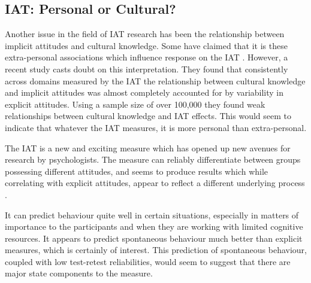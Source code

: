 


\subsection{IAT: Personal or Cultural?}
\label{sec:iat:-personal-or}


Another issue in the field of IAT research has been the relationship between implicit attitudes and cultural knowledge. Some have claimed that it is these extra-personal associations which influence response on the IAT \cite{Olson2004}. However, a recent study \cite{Nosek2007a} casts doubt on this interpretation. They found that consistently across domains measured by the IAT the relationship between cultural knowledge and implicit attitudes was almost completely accounted for by variability in explicit attitudes. Using a sample size of over 100,000 they found weak relationships between cultural knowledge and IAT effects. This would seem to indicate that whatever the IAT measures, it is more personal than extra-personal. 

The IAT is a new and exciting measure which has opened up new avenues for research by psychologists.   The measure can reliably differentiate between groups possessing different attitudes, and seems to produce results which while correlating with explicit attitudes, appear to reflect a different underlying process \cite{Nosek2007a}. 

It can predict behaviour quite well in certain situations, especially in matters of importance to the participants and when they are working with limited cognitive resources. It appears to predict spontaneous behaviour much better than explicit measures, which is certainly of interest. This prediction of spontaneous behaviour, coupled with low test-retest reliabilities, would seem to suggest that there are major state components to the measure. 


